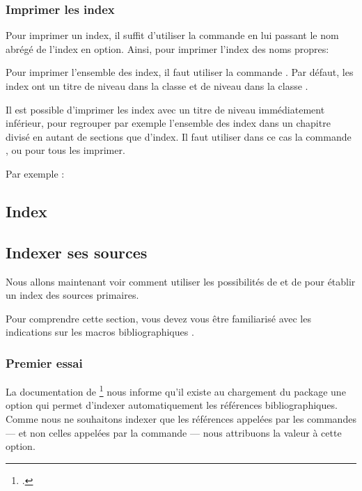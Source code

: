 \subsection{Imprimer les index}

Pour imprimer un index, il suffit d'utiliser la commande  en lui passant le nom abrégé de l'index en option. Ainsi, pour imprimer l'index des noms propres:

\begin{latexcode}
\printindex[npr]
\end{latexcode}

Pour imprimer l'ensemble des index, il faut utiliser la commande .
Par défaut, les index ont un titre de niveau  dans la classe  et de niveau  dans la classe .

 Il est possible d'imprimer les index avec un titre de niveau immédiatement inférieur, pour regrouper par exemple  l'ensemble des index dans un chapitre divisé en autant de sections que d'index. Il faut utiliser dans ce cas la commande , ou  pour tous les imprimer.

Par exemple :

\begin{latexcode}
\chapter{Index}
\printsubindex*
\end{latexcode}

\section{Indexer ses sources}


Nous allons maintenant voir comment utiliser les possibilités de  et de  pour établir un index des sources primaires.

Pour comprendre cette section, vous devez vous être familiarisé avec les indications sur les macros bibliographiques .



\subsection{Premier essai}

La documentation de \footcite{biblatex_options} nous informe qu'il existe  au chargement du package une option  qui permet d'indexer automatiquement les références bibliographiques. Comme nous ne souhaitons indexer que les références appelées par les commandes   ---  et non celles appelées par la commande  --- nous attribuons la valeur  à cette option. 

